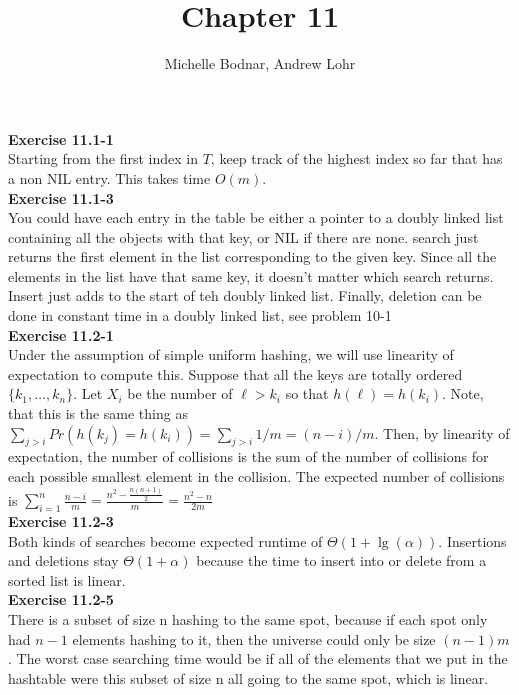 \documentclass{article}
\title{Chapter 11}
\author{Michelle Bodnar, Andrew Lohr}
\begin{document}
\maketitle

\noindent\textbf{ Exercise 11.1-1} \\

Starting from the first index in $T$, keep track of the highest index so far that has a non NIL entry. This takes time $O(m)$.\\


\noindent\textbf{ Exercise 11.1-3} \\
You could have each entry in the table be either a pointer to a doubly linked list containing all the objects with that key, or NIL if there are none. search just returns the first element in the list corresponding to the given key. Since all the elements in the list have that same key, it doesn't matter which search returns. Insert just adds to the start of teh doubly linked list. Finally, deletion can be done in constant time in a doubly linked list, see problem 10-1\\


\noindent\textbf{ Exercise 11.2-1} \\
Under the assumption of simple uniform hashing, we will use linearity of expectation to compute this. Suppose that all the keys are totally ordered $\{k_1,\ldots, k_{n}\}$. Let $X_i$ be the number of $\ell > k_i$ so that $h(\ell) = h(k_i)$. Note, that this is the same thing as $\sum_{j>i} Pr(h(k_j) = h(k_i)) = \sum_{j>i} 1/m = (n-i)/m$. Then, by linearity of expectation, the number of collisions is the sum of the number of collisions for each possible smallest element in the collision. The expected number of collisions is $\sum_{i=1}^n \frac{n-i}{m} = \frac{n^2  - \frac{n(n+1)}{2}}{m} = \frac{n^2 -n}{2m}$\\

\noindent\textbf{ Exercise 11.2-3} \\
Both kinds of searches become expected runtime of $\Theta(1+ \lg(\alpha))$. Insertions and deletions stay $\Theta(1+ \alpha)$ because the time to insert into or delete from a sorted list is linear. \\

\noindent\textbf{ Exercise 11.2-5} \\
There is a subset of size n hashing to the same spot, because if each spot only had $n-1$ elements hashing to it, then the universe could only be size $(n-1)m$. The worst case searching time would be if all of the elements that we put in the hashtable were this subset of size n all going to the same spot, which is linear. \\
\end{document}
